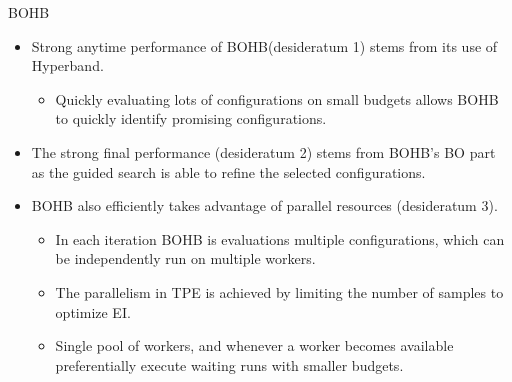\begin{frame}[c]{BOHB}
\begin{itemize}
    \item Strong anytime performance of BOHB(desideratum 1) stems from its use of Hyperband.
    \begin{itemize}
        \item Quickly evaluating lots of configurations on small budgets allows BOHB to quickly identify promising configurations.
        \pause
    \end{itemize}
    \item The strong final performance (desideratum 2) stems from BOHB's BO part as the guided search is able to refine the selected configurations.
    \pause
    \item BOHB also efficiently takes advantage of parallel resources (desideratum 3).
    \begin{itemize}
        \item In each iteration BOHB is evaluations multiple configurations, which can be independently run on multiple workers.
        \item The parallelism in TPE is achieved by limiting the number of samples to optimize EI.
        \item Single pool of workers, and whenever a worker becomes available preferentially execute waiting runs with smaller budgets.
    \end{itemize}
\end{itemize}

\end{frame}

